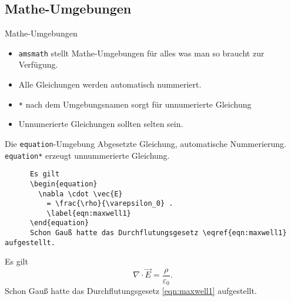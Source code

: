 \subsection{Mathe-Umgebungen}

\begin{frame}{Mathe-Umgebungen}
  \begin{itemize}
    \item \texttt{amsmath} stellt Mathe-Umgebungen für alles was man so braucht zur Verfügung.
      \item Alle Gleichungen werden automatisch nummeriert.
      \item \texttt{*} nach dem Umgebungsnamen sorgt für unnumerierte Gleichung
      \item Unnumerierte Gleichungen sollten selten sein.
  \end{itemize}
\end{frame}

\begin{frame}[fragile]{Die \texttt{equation}-Umgebung}
  Abgesetzte Gleichung, automatische Nummerierung. \\
  \texttt{equation*} erzeugt unnummerierte Gleichung.
  \begin{CodeExample}{0.60}
    \begin{lstlisting}
      Es gilt
      \begin{equation}
        \nabla \cdot \vec{E}
          = \frac{\rho}{\varepsilon_0} .
          \label{eqn:maxwell1}
      \end{equation}
      Schon Gauß hatte das Durchflutungsgesetz \eqref{eqn:maxwell1} aufgestellt.
    \end{lstlisting}
  \CodeResult
    Es gilt
    \begin{equation}
      \nabla \cdot \vec{E}
        = \frac{\rho}{\varepsilon_0} .
        \label{eqn:maxwell1}
    \end{equation}
    Schon Gauß hatte das Durchflutungsgesetz \eqref{eqn:maxwell1} aufgestellt.
  \end{CodeExample}
\end{frame}


